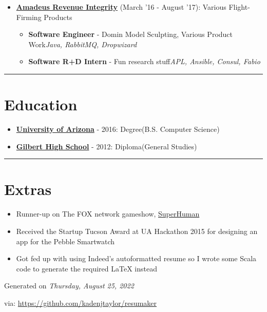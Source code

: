 \documentclass{article}
\begin{document}
\begin{itemize}
\item \href{https://amadeus.com/en/portfolio/airlines/revenue-integrity}{\textbf{Amadeus Revenue Integrity}} {(March '16 - August '17)}: Various Flight-Firming Products 
\begin{itemize}
\item \textbf{Software Engineer} - Domin Model Sculpting, Various Product Work\newline \textit{Java, RabbitMQ, Dropwizard}
\item \textbf{Software R+D Intern} - Fun research stuff\newline \textit{APL, Ansible, Consul, Fabio}
\end{itemize}

\end{itemize}

\noindent\rule{\linewidth}{1pt}

\section*{Education}

\begin{itemize}
\item \href{https://www.cs.arizona.edu/}{\textbf{University of Arizona}} - 2016: Degree(B.S. Computer Science)
\item \href{https://www.gilbertschools.net/gilberthigh}{\textbf{Gilbert High School}} - 2012: Diploma(General Studies)
\end{itemize}

\noindent\rule{\linewidth}{1pt}

\section*{Extras}

\begin{itemize}
\item Runner-up on The FOX network gameshow, \href{https://www.youtube.com/watch?v=t65mzlOCDF8}{SuperHuman}
\item Received the Startup Tucson Award at UA Hackathon 2015 for designing an app for the Pebble Smartwatch
\item Got fed up with using Indeed's autoformatted resume so I wrote some Scala code to generate the required LaTeX instead
\end{itemize}

\vspace*{\fill}
Generated on \textit{Thursday, August 25, 2022}

via: \url{https://github.com/kadenjtaylor/resumaker}
\end{document}
